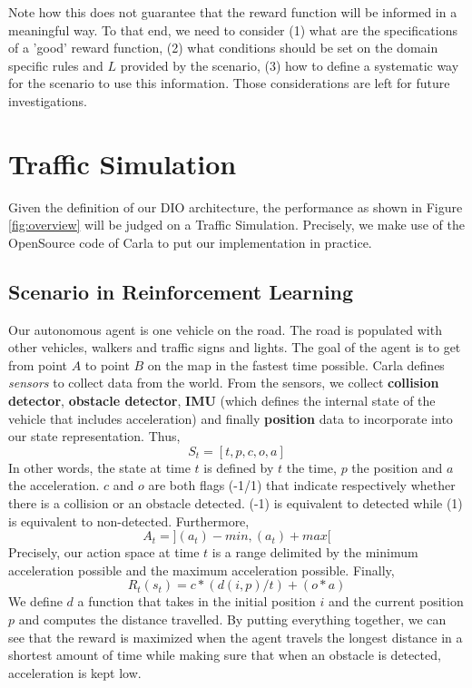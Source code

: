 \documentclass[a4paper,11pt]{article}
\begin{document}
Note how this does not guarantee that the reward function will be informed in a meaningful way.
To that end, we need to consider (1) what are the specifications of a 'good' reward function, (2) what conditions should be set 
on the domain specific rules and $L$ provided by the scenario, (3) how to define a systematic way for the scenario to use 
this information. Those considerations are left for future investigations. 

 

\section{Traffic Simulation} \label{traffic}
Given the definition of our DIO architecture, the performance as shown in Figure \ref{fig:overview} will be judged on a Traffic Simulation. 
Precisely, we make use of the OpenSource code of Carla \cite{Dosovitskiy17} to put our implementation in practice. 
\subsection{Scenario in Reinforcement Learning}
Our autonomous agent is one vehicle on the road. The road is populated with other vehicles, walkers and traffic signs and lights. 
The goal of the agent is to get from point $A$ to point $B$ on the map in the fastest time possible. Carla defines \emph{sensors} to collect 
data from the world. From the sensors, we collect \textbf{collision detector}, \textbf{obstacle detector}, \textbf{IMU} (which defines the internal state of the vehicle that includes acceleration)
and finally \textbf{position} data to incorporate into our state representation. Thus, 
\begin{equation*}
  S_t = [t, p, c, o, a]
\end{equation*} 
In other words, the state at time $t$ is defined by $t$ the time, $p$ the position and $a$ the acceleration. $c$ and $o$ are both flags (-1/1) that indicate 
respectively whether there is a collision or an obstacle detected. (-1) is equivalent to detected while (1) is equivalent to non-detected. Furthermore, 
\begin{equation*}
  A_t = ](a_t)-min, (a_t)+max[
\end{equation*}
Precisely, our action space at time $t$ is a range delimited by the minimum acceleration possible and the maximum acceleration possible. Finally, 
\begin{equation*}
  R_t(s_t) = c * (d(i, p)/t) + (o * a)
\end{equation*}
We define $d$ a function that takes in the initial position $i$ and the current position $p$ and computes the distance travelled. 
By putting everything together, we can see that the reward is maximized when the agent travels the longest distance in a shortest 
amount of time while making sure that when an obstacle is detected, acceleration is kept low. 
\end{document}
